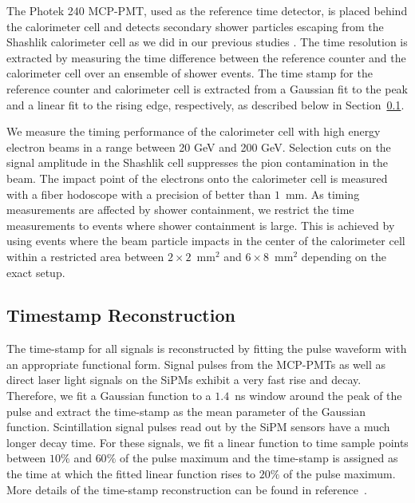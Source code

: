 The Photek 240 MCP-PMT, used as the reference time detector, is placed behind the
calorimeter cell and detects secondary shower particles escaping from the
Shashlik calorimeter cell as we did in our previous studies \cite{Anderson:2015gha}.
The time resolution is extracted by measuring the time difference between the
reference counter and the calorimeter cell over an ensemble of shower events.
The time stamp for the reference counter and calorimeter cell is extracted
from a Gaussian fit to the peak and a linear fit to the rising edge, 
respectively, as described below in Section~\ref{sec:reco}.

We measure the timing performance of the calorimeter cell with high energy electron beams
in a range between 20 GeV and 200 GeV. Selection cuts on the signal amplitude in the Shashlik cell
suppresses the pion contamination in the beam. The impact point of the electrons
onto the calorimeter cell is measured with a fiber hodoscope with a precision of
better than $1$~mm. As timing measurements are affected by shower containment,
we restrict the time measurements to events where shower containment is large.
This is achieved by using events where the beam particle impacts in the center
of the calorimeter cell within a restricted area between
$2\times2$~$\mathrm{mm}^{2}$ and $6\times8$~$\mathrm{mm}^{2}$ depending on the
exact setup. 

\subsection{Timestamp Reconstruction} \label{sec:reco} The time-stamp for all
signals is reconstructed by fitting the pulse waveform with an appropriate
functional form. Signal pulses from the MCP-PMTs as well as direct laser light
signals on the SiPMs exhibit a very fast rise and decay. Therefore, we fit a
Gaussian function to a $1.4$~ns window around the peak of the pulse and extract
the time-stamp as the mean parameter of the Gaussian function. Scintillation
signal pulses read out by the SiPM sensors have a much longer decay time. For
these signals, we fit a linear function to time sample points between $10\%$ and
$60\%$ of the pulse maximum and the time-stamp is assigned as the time at which
the fitted linear function rises to $20\%$ of the pulse maximum. More details of
the time-stamp reconstruction can be found in reference~\cite{Anderson:2015gha}.
